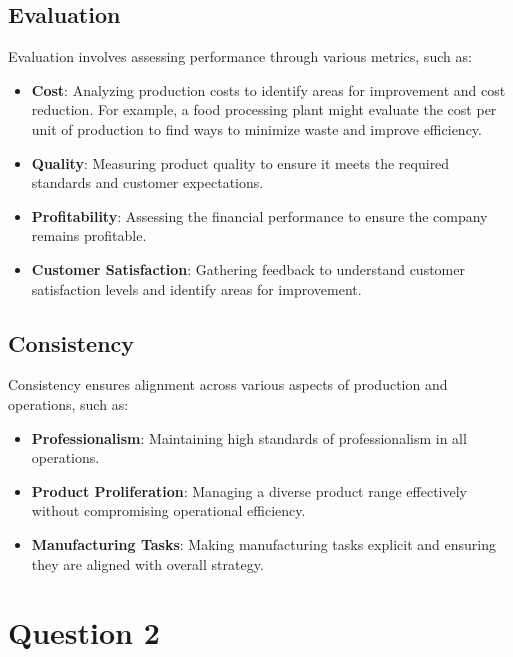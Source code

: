 \documentclass[12pt]{article}
\begin{document}
\subsection*{Evaluation}

Evaluation involves assessing performance through various metrics, such as: \begin{itemize}
    \item \textbf{Cost}: Analyzing production costs to identify areas for improvement and cost reduction. For example, a food processing plant might evaluate the cost per unit of production to find ways to minimize waste and improve efficiency.
    \item \textbf{Quality}: Measuring product quality to ensure it meets the required standards and customer expectations.
    \item \textbf{Profitability}: Assessing the financial performance to ensure the company remains profitable. 
    \item \textbf{Customer Satisfaction}: Gathering feedback to understand customer satisfaction levels and identify areas for improvement.
\end{itemize}

\subsection*{Consistency}

Consistency ensures alignment across various aspects of production and operations, such as: \begin{itemize}
    \item \textbf{Professionalism}: Maintaining high standards of professionalism in all operations. 
    \item \textbf{Product Proliferation}: Managing a diverse product range effectively without compromising operational efficiency. 
    \item \textbf{Manufacturing Tasks}: Making manufacturing tasks explicit and ensuring they are aligned with overall strategy.
\end{itemize}

\newpage 

\section*{Question 2}


\end{document}
